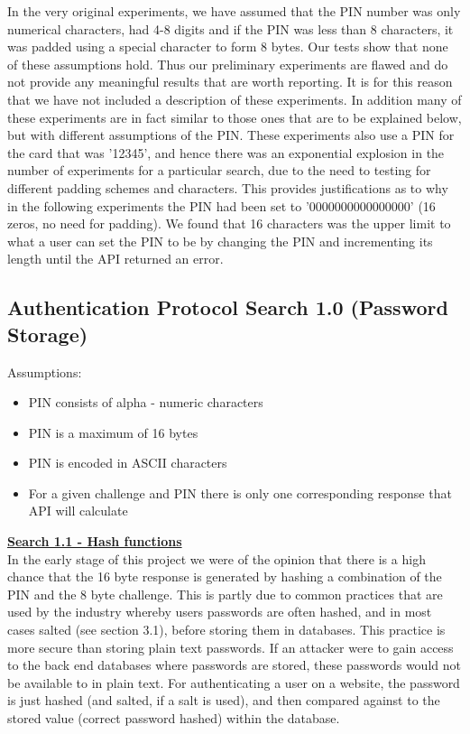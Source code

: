 \documentclass[bsc,frontabs,twoside,singlespacing,parskip,deptreport]{infthesis}     %
\begin{document}
In the very original experiments, we have assumed that the PIN number was only numerical characters, had 4-8 digits and if the PIN was less than 8 characters, it was padded using a special character to form 8 bytes. Our tests show that none of these assumptions hold. Thus our preliminary experiments are flawed and do not provide any meaningful results that are worth reporting. It is for this reason that we have not included a description of these experiments. In addition many of these experiments are in fact similar to those ones that are to be explained below, but with different assumptions of the PIN. These experiments also use a PIN for the card that was '12345', and hence there was an exponential explosion in the number of experiments for a particular search, due to the need to testing for different padding schemes and characters. This provides justifications as to why in the following experiments the PIN had been set to '0000000000000000' (16 zeros, no need for padding). We found that 16 characters was the upper limit to what a user can set the PIN to be by changing the PIN and incrementing its length until the API returned an error.


\subsection{Authentication Protocol Search 1.0 (Password Storage)}
Assumptions:
\begin{itemize}
\item PIN consists of alpha - numeric characters
\item PIN is a maximum of 16 bytes
\item PIN is encoded in ASCII characters
\item For a given challenge and PIN there is only one corresponding response that API will calculate\\
\end{itemize}

\textbf{\underline{Search 1.1 - Hash functions}}\\
In the early stage of this project we were of the opinion that there is a high chance that the 16 byte response is generated by hashing a combination of the PIN and the 8 byte challenge. This is partly due to common practices that are used by the industry whereby users passwords are often hashed, and in most cases salted (see section 3.1), before storing them in databases. This practice is more secure than storing plain text passwords. If an attacker were to gain access to the back end databases  where passwords are stored, these passwords would not be available to in plain text. For authenticating a user on a website, the password is just hashed (and salted, if a salt is used), and then compared against to the stored value (correct password hashed) within the database. 
\end{document}
